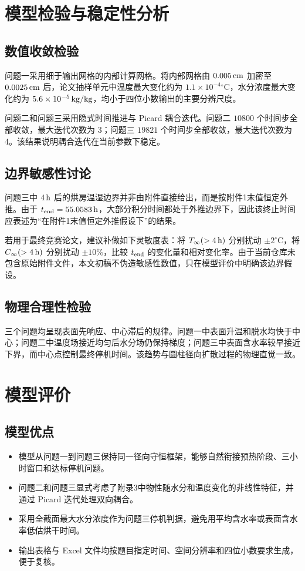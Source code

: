 \documentclass[UTF8,a4paper,12pt]{ctexart}
\numberwithin{equation}{section}
\begin{document}
\section{模型检验与稳定性分析}
\subsection{数值收敛检验}
问题一采用细于输出网格的内部计算网格。将内部网格由 $0.005\rm\,cm$ 加密至 $0.0025\rm\,cm$ 后，论文抽样单元中温度最大变化约为 $1.1\times10^{-4}{}^\circ\mathrm C$，水分浓度最大变化约为 $5.6\times10^{-5}\rm\,kg/kg$，均小于四位小数输出的主要分辨尺度。

问题二和问题三采用隐式时间推进与 Picard 耦合迭代。问题二 $10800$ 个时间步全部收敛，最大迭代次数为 3；问题三 $19821$ 个时间步全部收敛，最大迭代次数为 4。该结果说明耦合迭代在当前参数下稳定。

\subsection{边界敏感性讨论}
问题三中 $4\rm\,h$ 后的烘房温湿边界并非由附件直接给出，而是按附件1末值恒定外推。由于 $t_{\rm end}=55.0583\rm\,h$，大部分积分时间都处于外推边界下，因此该终止时间应表述为“在附件1末值恒定外推假设下”的结果。

若用于最终竞赛论文，建议补做如下灵敏度表：将 $T_\infty(>4\rm\,h)$ 分别扰动 $\pm2^\circ\mathrm C$，将 $C_\infty(>4\rm\,h)$ 分别扰动 $\pm10\%$，比较 $t_{\rm end}$ 的变化量和相对变化率。由于当前仓库未包含原始附件文件，本文初稿不伪造敏感性数值，只在模型评价中明确该边界假设。

\subsection{物理合理性检验}
三个问题均呈现表面先响应、中心滞后的规律。问题一中表面升温和脱水均快于中心；问题二中温度场接近均匀后水分场仍保持梯度；问题三中表面含水率较早接近下界，而中心点控制最终停机时间。该趋势与圆柱径向扩散过程的物理直觉一致。

\section{模型评价}
\subsection{模型优点}
\begin{itemize}[leftmargin=2em]
  \item 模型从问题一到问题三保持同一径向守恒框架，能够自然衔接预热阶段、三小时窗口和达标停机问题。
  \item 问题二和问题三显式考虑了附录3中物性随水分和温度变化的非线性特征，并通过 Picard 迭代处理双向耦合。
  \item 采用全截面最大水分浓度作为问题三停机判据，避免用平均含水率或表面含水率低估烘干时间。
  \item 输出表格与 Excel 文件均按题目指定时间、空间分辨率和四位小数要求生成，便于复核。
\end{itemize}
\end{document}
